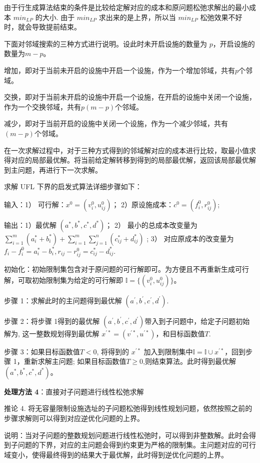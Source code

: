 \documentclass[UTF8]{article}
\begin{document}
由于行生成算法结束的条件是比较给定解对应的成本和原问题松弛求解出的最小成本 $min_{LP}$ 的大小. 由于 $min_{LP}$ 求出来的是上界，所以当 $min_{LP}$ 松弛效果不好时，就会导致提前结束。

下面对邻域搜索的三种方式进行说明。设此时未开启设施的数量为 $p$，开启设施的数量为$m-p$。

增加，即对于当前未开启的设施中开启一个设施，作为一个增加邻域，共有$p$个邻域。

交换，即对于当前未开启的设施中开启一个设施，在开启的设施中关闭一个设施，作为一个交换邻域，共有$p(m-p)$个邻域。

减少，即对于当前开启的设施中关闭一个设施，作为一个减少邻域，共有$(m-p)$个邻域。

在一次求解过程中，对于三种方式得到的邻域解对应的成本进行比较，取最小值求得对应的局部最优解。将当前给定解转移到得到的局部最优解，返回该局部最优解到主问题，再进行下一次求解。

求解 UFL 下界的启发式算法详细步骤如下：

输入：1） 可行解：$x^0=(v_i^0,u_{ij}^0)$； 2）原设施成本：$c^0=(f_i^0,r_{ij}^0)$;

输出：1）最优解 $(a^{*},b^{*},c^{*},d^{*})$；
2） 最小的总成本改变量为
$\sum_{i=1}^m(a^{*}_i+b^{*}_i)+\sum_{i=1}^m\sum_{j=1}^n(c^{*}_{ij}+d^{*}_{ij})$ ;
3） 对应原成本的改变量为 $f_i-f_i^0 = a^{*}_i-b^{*}_i,r_{ij}-r_{ij}^0=c^{*}_{ij}-d^{*}_{ij}$.

初始化：初始限制集包含对于原问题的可行解即可。为方便且不再重新生成可行解，可取初始限制集为给定的可行解即 $\mathbb{I} = \{(v_i^0,u_{ij}^0)\} $。

步骤 1：求解此时的主问题得到最优解 $(a^{'},b^{'},c^{'},d^{'})$.

步骤 2：将步骤 1得到的最优解 $(a^{'},b^{'},c^{'},d^{'})$带入到子问题中，给定子问题初始解为$ $, 这一整数规划得到最优解 $x^{'*}=(v^{'*},u^{'*})$，和目标函数值$T$.

步骤 3：如果目标函数值$T< 0$, 将得到的 $x^{'*}$ 加入到限制集中$\mathbb{I} = \mathbb{I} \cup x^{'*}$，回到步骤 1，重新求解主问题;  如果目标函数值$T\geq 0$,则结束算法。此时得到最优解$(a^{*},b^{*},c^{*},d^{*})$。


\textbf{处理方法 4}：直接对子问题进行线性松弛求解

推论 4. 将无容量限制设施选址的子问题松弛得到线性规划问题，依然按照之前的步骤求解则可以得到对应逆优化问题的上界。

说明：当对子问题的整数规划问题进行线性松弛时，可以得到非整数解。此时会得到子问题的下界，对应的主问题会得到约束更为严格的限制集。主问题对应的可行域变小，使得最终得到的结果大于最优解，此时得到逆优化问题的上界。
\end{document}
